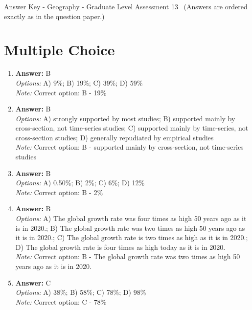 \documentclass[12pt]{article}
\begin{document}
\begin{center}
Answer Key - Geography - Graduate Level Assessment 13 \
\small (Answers are ordered exactly as in the question paper.)
\end{center}

\section*{Multiple Choice}
\begin{enumerate}[label=\arabic*.]
\item \textbf{Answer:} B
\\ \textit{Options:} A) 9\%; B) 19\%; C) 39\%; D) 59\%
\\ \textit{Note:} Correct option: B - 19\%
\item \textbf{Answer:} B
\\ \textit{Options:} A) strongly supported by most studies; B) supported mainly by cross-section, not time-series studies; C) supported mainly by time-series, not cross-section studies; D) generally repudiated by empirical studies
\\ \textit{Note:} Correct option: B - supported mainly by cross-section, not time-series studies
\item \textbf{Answer:} B
\\ \textit{Options:} A) 0.50\%; B) 2\%; C) 6\%; D) 12\%
\\ \textit{Note:} Correct option: B - 2\%
\item \textbf{Answer:} B
\\ \textit{Options:} A) The global growth rate was four times as high 50 years ago as it is in 2020.; B) The global growth rate was two times as high 50 years ago as it is in 2020.; C) The global growth rate is two times as high as it is in 2020.; D) The global growth rate is four times as high today as it is in 2020.
\\ \textit{Note:} Correct option: B - The global growth rate was two times as high 50 years ago as it is in 2020.
\item \textbf{Answer:} C
\\ \textit{Options:} A) 38\%; B) 58\%; C) 78\%; D) 98\%
\\ \textit{Note:} Correct option: C - 78\%
\end{enumerate}
\end{document}
